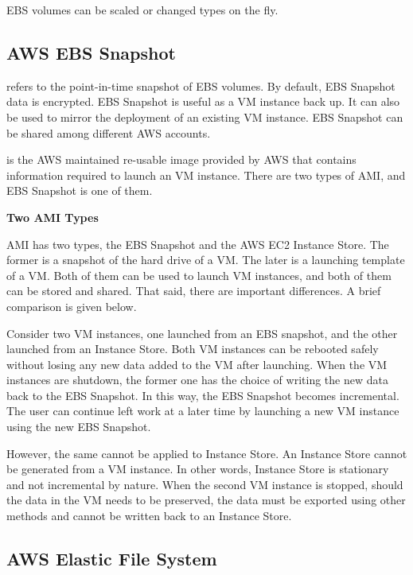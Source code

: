 EBS volumes can be scaled or changed types on the fly.

\subsection{AWS EBS Snapshot}

 refers to the point-in-time snapshot of EBS volumes. By default, EBS Snapshot data is encrypted. EBS Snapshot is useful as a VM instance back up. It can also be used to mirror the deployment of an existing VM instance. EBS Snapshot can be shared among different AWS accounts. 

 is the AWS maintained re-usable image provided by AWS that contains information required to launch an VM instance. There are two types of AMI, and EBS Snapshot is one of them. 

\begin{mdframed}
\noindent \textbf{Two AMI Types}

AMI has two types, the EBS Snapshot and the AWS EC2 Instance Store. The former is a snapshot of the hard drive of a VM. The later is a launching template of a VM. Both of them can be used to launch VM instances, and both of them can be stored and shared. That said, there are important differences. A brief comparison is given below.

Consider two VM instances, one launched from an EBS snapshot, and the other launched from an Instance Store. Both VM instances can be rebooted safely without losing any new data added to the VM after launching. When the VM instances are shutdown, the former one has the choice of writing the new data back to the EBS Snapshot. In this way, the EBS Snapshot becomes incremental. The user can continue left work at a later time by launching a new VM instance using the new EBS Snapshot. 

However, the same cannot be applied to Instance Store. An Instance Store cannot be generated from a VM instance. In other words,  Instance Store is stationary and not incremental by nature. When the second VM instance is stopped, should the data in the VM needs to be preserved, the data must be exported using other methods and cannot be written back to an Instance Store.

\end{mdframed}

\subsection{AWS Elastic File System}

